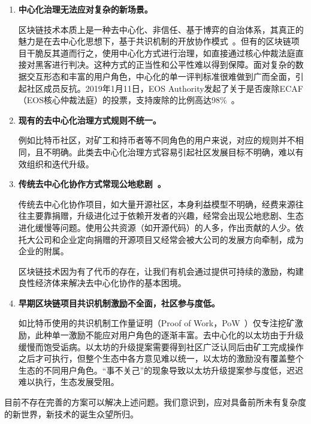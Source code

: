 \begin{enumerate}
	\item 

	\textbf{中心化治理无法应对复杂的新场景。}

	区块链技术本质上是⼀种去中心化、⾮信任、基于博弈的⾃治体系，其真正的魅力是在去中⼼化思想下，基于共识机制的开放协作模式~\cite{whitepaper}。但有的区块链项目干脆反其道而行之，使用中心化方式进行治理，如直接通过核心仲裁法庭直接对黑客进行判决。这种方式的正当性和公平性难以得到保障。面对复杂的数据交互形态和丰富的用户角色，中心化的单一评判标准很难做到广而全面，引起社区成员反抗。2019年1月11日，EOS Authority发起了关于是否废除ECAF（EOS核心仲裁法庭）的投票，支持废除的比例高达98\%~\cite{DeleteECAF}。

	\item 

	\textbf{现有的去中心化治理方式规则不统一。}

	例如比特币社区，对矿工和持币者等不同角色的用户来说，对应的规则并不相同，且不明确。此类去中心化治理方式容易引起社区发展目标不明确，难以有效组织和迭代升级。

	\item 

	\textbf{传统去中心化协作方式常现公地悲剧~\cite{TragedyOfTheCommons}。}

	传统去中心化协作项目，如大量开源社区，本身利益模型不明确，经费来源往往主要靠捐赠，升级进化过于依赖开发者的兴趣，经常会出现公地悲剧、生态进化缓慢等问题。使用公共资源（如开源代码）的人多，作出贡献的人少。依托大公司和企业定向捐赠的开源项目又经常会被大公司的发展方向牵制，成为企业的附属。

	区块链技术因为有了代币的存在，让我们有机会通过提供可持续的激励，构建良性经济体来解决去中心化协作的基本困境。

	\item

	\textbf{早期区块链项目共识机制激励不全面，社区参与度低。}

	如比特币使用的共识机制工作量证明（Proof of Work，PoW~\cite{pow}）仅专注挖矿激励，此种单一激励不能应对用户角色的逐渐丰富。去中心化的以太坊由于升级缓慢而饱受诟病。以太坊的升级提案需要得到社区广泛认同后由矿工完成操作之后才可执行，但整个生态中各方意见难以统一，以太坊的激励没有覆盖整个生态的不同用户角色。“事不关己”的现象导致以太坊升级提案参与度低，迟迟难以执行，生态发展受阻。

\end{enumerate}

目前不存在完善的方案可以解决上述问题。我们意识到，应对具备前所未有复杂度的新世界，新技术的诞生众望所归。

